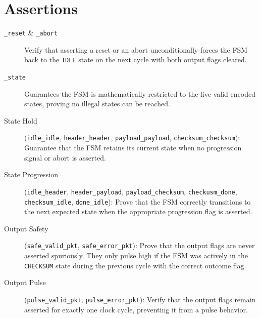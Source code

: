 \section{Assertions}
\begin{description}
    \item[\texttt{\_reset} \& \texttt{\_abort}]
        Verify that asserting a reset or an abort unconditionally forces the FSM back to the \texttt{IDLE} state on the next cycle with both output flags cleared.
        
    \item[\texttt{\_state}]
        Guarantees the FSM is mathematically restricted to the five valid encoded states, proving no illegal states can be reached.
        
    \item[State Hold] (\texttt{idle\_idle}, \texttt{header\_header}, \texttt{payload\_payload}, \texttt{checksum\_checksum}):
        Guarantee that the FSM retains its current state when no progression signal or abort is asserted.
        
        \newpage
    \item[State Progression] (\texttt{idle\_header}, \texttt{header\_payload}, \texttt{payload\_checksum}, \texttt{checkusm\_done}, \texttt{checksum\_idle}, \texttt{done\_idle}):
        Prove that the FSM correctly transitions to the next expected state when the appropriate progression flag is asserted.
        
    \item[Output Safety] (\texttt{safe\_valid\_pkt}, \texttt{safe\_error\_pkt}):
        Prove that the output flags are never asserted spuriously.
        They only pulse high if the FSM was actively in the \texttt{CHECKSUM} state during the previous cycle with the correct outcome flag.
        
    \item[Output Pulse] (\texttt{pulse\_valid\_pkt}, \texttt{pulse\_error\_pkt}):
        Verify that the output flags remain asserted for exactly one clock cycle, preventing it from a pulse behavior.
        
\end{description}